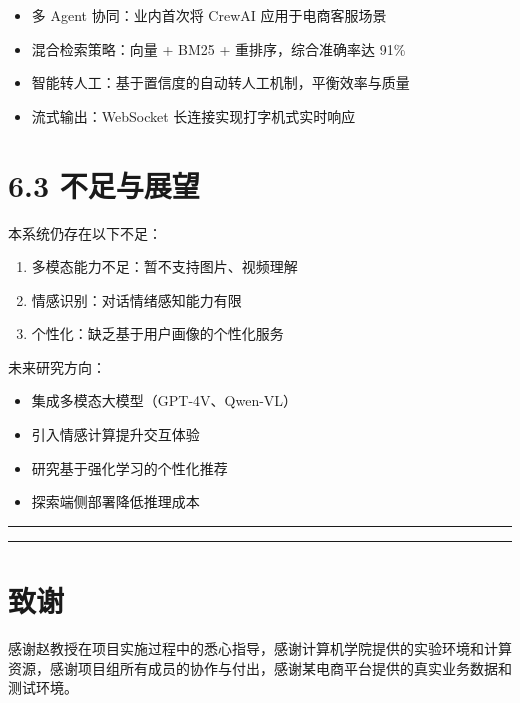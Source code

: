 \documentclass{harryopo-report}
\begin{document}
\begin{itemize}
  \item {\fzht 多 Agent 协同}：业内首次将 CrewAI 应用于电商客服场景
  \item {\fzht 混合检索策略}：向量 + BM25 + 重排序，综合准确率达 91\%
  \item {\fzht 智能转人工}：基于置信度的自动转人工机制，平衡效率与质量
  \item {\fzht 流式输出}：WebSocket 长连接实现打字机式实时响应
\end{itemize}

\section*{6.3 不足与展望}

本系统仍存在以下不足：

\begin{enumerate}
  \item {\fzht 多模态能力不足}：暂不支持图片、视频理解
  \item {\fzht 情感识别}：对话情绪感知能力有限
  \item {\fzht 个性化}：缺乏基于用户画像的个性化服务
\end{enumerate}

未来研究方向：

\begin{itemize}
  \item 集成多模态大模型（GPT-4V、Qwen-VL）
  \item 引入情感计算提升交互体验
  \item 研究基于强化学习的个性化推荐
  \item 探索端侧部署降低推理成本
\end{itemize}

\medskip\hrule\medskip

\medskip\hrule\medskip

\section*{致谢}

感谢赵教授在项目实施过程中的悉心指导，感谢计算机学院提供的实验环境和计算资源，感谢项目组所有成员的协作与付出，感谢某电商平台提供的真实业务数据和测试环境。
\end{document}
